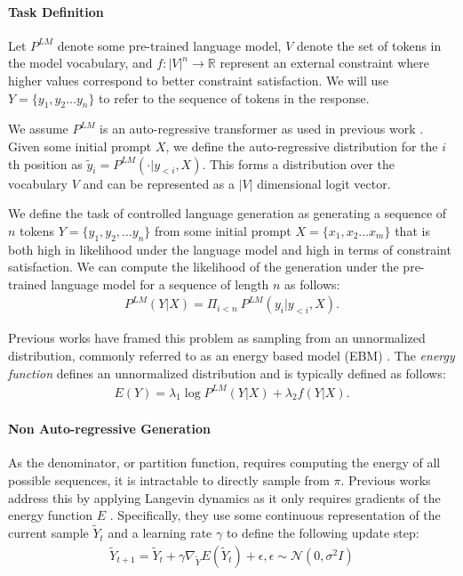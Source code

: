 \paragraph{Task Definition} Let $P^{LM}$ denote some pre-trained language model, $V$ denote the set of tokens in the model vocabulary, and $f: |V|^n \to \mathbb{R}$ represent an external constraint where higher values correspond to better constraint satisfaction. We will use $Y = \{y_1, y_2 \dots y_n\}$ to refer to the sequence of tokens in the response. 

We assume $P^{LM}$ is an auto-regressive transformer as used in previous work \citep{qin2022cold, kumar2022gradient, liu2023bolt}. Given some initial prompt $X$, we define the auto-regressive distribution for the $i$th position as $ \tilde{y}_i = P^{LM} ( \cdot | y_{<i}, X)$. This forms a distribution over the vocabulary $V$ and can be represented as a $|V|$ dimensional logit vector. 

We define the task of controlled language generation as generating a sequence of $n$ tokens $Y = \{y_1, y_2, \dots y_n\}$ from some initial prompt $X = \{x_1, x_2 \dots x_m\}$ that is both high in likelihood under the language model and high in terms of constraint satisfaction. We can compute the likelihood of the generation under the pre-trained language model for a sequence of length $n$ as follows: 
\begin{align}
    P^{LM}(Y | X) = \Pi_{i < n} \ P^{LM}(y_i | y_{<i}, X).
\end{align}

Previous works have framed this problem as sampling from an unnormalized distribution, commonly referred to as an energy based model (EBM) \citep{mireshghallah-etal-2022-mix, qin2022cold, kumar2022gradient, liu2023bolt}. The \textit{energy function} defines an unnormalized distribution and is typically defined as follows: 
\begin{align}
    E(Y) = \lambda_1 \log P^{LM} (Y | X) + \lambda_2 f(Y|X)
    \label{eq:prior-energy-def}.
\end{align}
\paragraph{Non Auto-regressive Generation} As the denominator, or partition function, requires computing the energy of all possible sequences, it is intractable to directly sample from $\pi$. Previous works address this by applying Langevin dynamics as it only requires gradients of the energy function $E$ \citep{qin2022cold, kumar2022gradient}. 
Specifically, they use some continuous representation of the current sample $\tilde{Y}_t$ and a learning rate $\gamma$ to define the following update step:  
\begin{align}
    \tilde{Y}_{t+1} = \tilde{Y}_{t} + \gamma \nabla_{\tilde{Y}} E(\tilde{Y}_t) + \epsilon, \epsilon \sim \mathcal{N}(0, \sigma^2 I)
    \label{eq:grad-update-lang}
\end{align}

